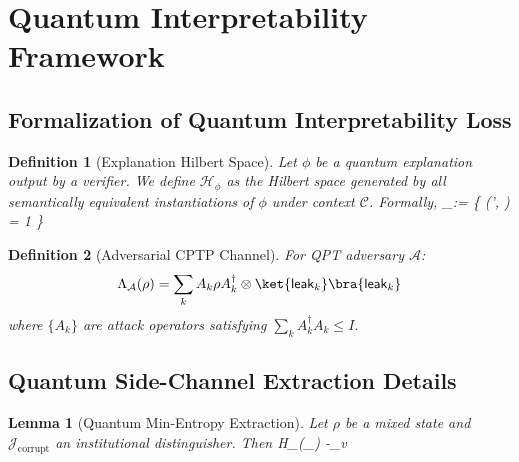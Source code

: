 \documentclass[preprint,12pt]{elsarticle}
\newtheorem{definition}{Definition}[section]
\newtheorem{lemma}{Lemma}[section]
\begin{document}
        \section{Quantum Interpretability Framework}\label{app:Appendix_B}

            \subsection{Formalization of Quantum Interpretability Loss}\label{app:B.1_form_qt_interpret} 

                \begin{definition}[Explanation Hilbert Space]\label{def:explanation_hilbert_space} 
                    Let $\phi$ be a quantum explanation output by a verifier. We define $\mathcal{H}_\phi$ as the Hilbert space generated by all semantically equivalent instantiations of $\phi$ under context $\mathcal{C}$. Formally,
                    _\phi :=  \left\{  \mid {}(\phi', ) = 1 \right\}
                \end{definition}
                \begin{definition}[Adversarial CPTP Channel]
                    For QPT adversary $\mathcal{A}$:
                    \begin{equation}
                        \Lambda_{\mathcal{A}}(\rho) = \sum_k A_k \rho A_k^\dagger \otimes \ket{\mathsf{leak}_k}\bra{\mathsf{leak}_k}
                    \end{equation}
                    where $\{A_k\}$ are attack operators satisfying $\sum_k A_k^\dagger A_k \leq I$.
                \end{definition}

            \subsection{Quantum Side-Channel Extraction Details}\label{app:B.2_qt_sce} 

                \begin{lemma}[Quantum Min-Entropy Extraction]\label{lem:min_entropy_extraction} 
                    Let $\rho$ be a mixed state and $\mathcal{J}_{\text{corrupt}}$ an institutional distinguisher. Then
                    H_\infty(\rho \mid {}_{}) \geq -\log \max_v 
                \end{lemma} 
\end{document}
